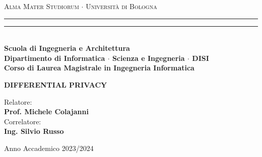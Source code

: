 \begin{titlepage}
    \begin{center}
        {{\Large{\textsc{Alma Mater Studiorum $\cdot$ Universit\`a di Bologna}}}}
        \rule[0.1cm]{15cm}{0.1mm}
        \rule[0.5cm]{15cm}{0.6mm}
        \\\vspace{3mm}
        {\small{\bf Scuola di Ingegneria e Architettura \\
                Dipartimento di Informatica $\cdot$ Scienza e Ingegneria $\cdot$ DISI\\
                Corso di Laurea Magistrale in Ingegneria Informatica}}
    \end{center}

    \vspace{23mm}

    \begin{center}{
            \large \bf DIFFERENTIAL PRIVACY\par
        }\end{center}
    \vspace{40mm} \par \noindent
    \begin{minipage}[t]{0.47\textwidth}{
        \large{Relatore:
        \vspace{2mm}\\
        {\bf Prof. Michele Colajanni}
        }
        \vspace{4mm}\\
        \large{Correlatore:
        \vspace{2mm}\\
        {\bf Ing. Silvio Russo}
        }
    }
    \end{minipage}
    \hfill
    \begin{minipage}[t]{0.47\textwidth}
    \end{minipage}
    \vspace{40mm}
    \begin{center}
        Anno Accademico 2023/2024
    \end{center}
\end{titlepage}